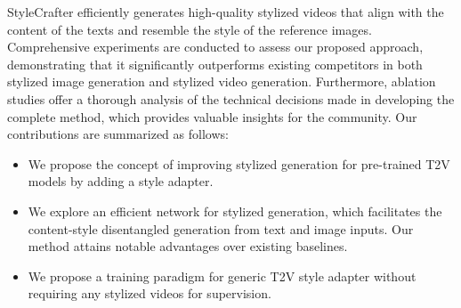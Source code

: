 StyleCrafter efficiently generates high-quality stylized videos that align with the content of the texts and resemble the style of the reference images.
Comprehensive experiments are conducted to assess our proposed approach, demonstrating that it significantly outperforms existing competitors in both stylized image generation and stylized video generation. Furthermore, ablation studies offer a thorough analysis of the technical decisions made in developing the complete method, which provides valuable insights for the community.
Our contributions are summarized as follows:
\begin{itemize}
    \item We propose the concept of improving stylized generation for pre-trained T2V models by adding a style adapter.
    \item We explore an efficient network for stylized generation, which facilitates the content-style disentangled generation from text and image inputs. Our method attains notable advantages over existing baselines.
    \item We propose a training paradigm for generic T2V style adapter without requiring any stylized videos for supervision.
\end{itemize}
